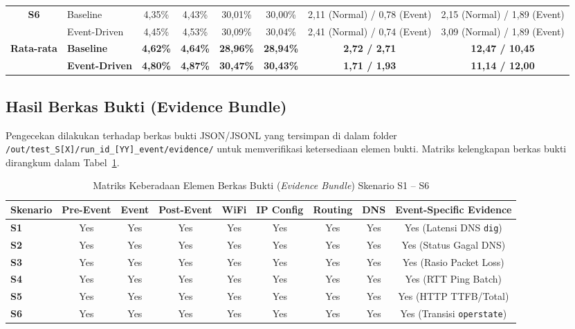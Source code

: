 \begin{table}[t]
\begin{tabular}{clcccccc}
\hline
\multirow{2}{*}{\textbf{S6}} & Baseline & 4,35\% & 4,43\% & 30,01\% & 30,00\% & 2,11 (Normal) / 0,78 (Event) & 2,15 (Normal) / 1,89 (Event) \\
 & Event-Driven & 4,45\% & 4,53\% & 30,09\% & 30,04\% & 2,41 (Normal) / 0,74 (Event) & 3,09 (Normal) / 1,89 (Event) \\
\hline
\multirow{2}{*}{\textbf{Rata-rata}} & \textbf{Baseline} & \textbf{4,62\%} & \textbf{4,64\%} & \textbf{28,96\%} & \textbf{28,94\%} & \textbf{2,72 / 2,71} & \textbf{12,47 / 10,45} \\
 & \textbf{Event-Driven} & \textbf{4,80\%} & \textbf{4,87\%} & \textbf{30,47\%} & \textbf{30,43\%} & \textbf{1,71 / 1,93} & \textbf{11,14 / 12,00} \\
\bottomrule
\end{tabular}
\end{table}

\subsection{Hasil Berkas Bukti (Evidence Bundle)}
Pengecekan dilakukan terhadap berkas bukti JSON/JSONL yang tersimpan di dalam folder \texttt{/out/test\_S[X]/run\_id\_[YY]\_event/evidence/} untuk memverifikasi ketersediaan elemen bukti. Matriks kelengkapan berkas bukti dirangkum dalam Tabel~\ref{tab-checklist-evidence}.

\begin{table}[t]
\caption{Matriks Keberadaan Elemen Berkas Bukti (\textit{Evidence Bundle}) Skenario S1 -- S6}
\label{tab-checklist-evidence}
\centering
\begin{tabular}{lcccccccc}
\toprule
\textbf{Skenario} & \textbf{Pre-Event} & \textbf{Event} & \textbf{Post-Event} & \textbf{WiFi} & \textbf{IP Config} & \textbf{Routing} & \textbf{DNS} & \textbf{Event-Specific Evidence} \\
\midrule
\textbf{S1} & Yes & Yes & Yes & Yes & Yes & Yes & Yes & Yes (Latensi DNS \texttt{dig}) \\
\textbf{S2} & Yes & Yes & Yes & Yes & Yes & Yes & Yes & Yes (Status Gagal DNS) \\
\textbf{S3} & Yes & Yes & Yes & Yes & Yes & Yes & Yes & Yes (Rasio Packet Loss) \\
\textbf{S4} & Yes & Yes & Yes & Yes & Yes & Yes & Yes & Yes (RTT Ping Batch) \\
\textbf{S5} & Yes & Yes & Yes & Yes & Yes & Yes & Yes & Yes (HTTP TTFB/Total) \\
\textbf{S6} & Yes & Yes & Yes & Yes & Yes & Yes & Yes & Yes (Transisi \texttt{operstate}) \\
\bottomrule
\end{tabular}
\end{table}

